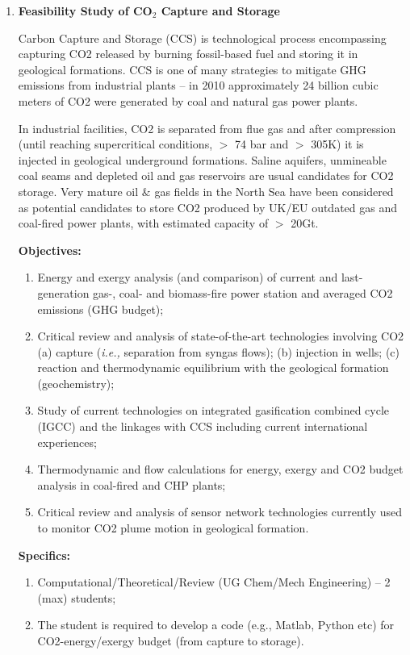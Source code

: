 \documentclass[12pts,a4paper,amsmath,amssymb,floatfix]{article}%
\newcommand{\Chem}{UG Chem/Mech Engineering}
\newcommand{\ie}{{\it i.e., }}
\begin{document}
\begin{enumerate}[label=\bfseries Project: \arabic*:]
\item {\bf Feasibility Study of CO$_{2}$ Capture and Storage}

Carbon Capture and Storage (CCS) is technological process encompassing capturing CO2 released by burning fossil-based fuel and storing it in geological formations. CCS is one of many strategies to mitigate GHG emissions from industrial plants – in 2010 approximately 24 billion cubic meters of CO2 were generated by coal and natural gas power plants. 


In industrial facilities, CO2 is separated from flue gas and after compression (until reaching supercritical conditions, $>$ 74 bar and $>$ 305K) it is injected in geological underground formations. Saline aquifers, unmineable coal seams and depleted oil and gas reservoirs are usual candidates for CO2 storage. Very mature oil $\&$ gas fields in the North Sea have been considered as potential candidates to store CO2 produced by UK/EU outdated gas and coal-fired power plants, with estimated capacity of $>$ 20Gt.

\noindent
{\bf Objectives:}
\begin{enumerate}
\item Energy and exergy analysis (and comparison) of current and last-generation gas-, coal- and biomass-fire power station and averaged CO2 emissions (GHG budget);
\item Critical review and analysis of state-of-the-art technologies involving CO2 (a) capture (\ie separation from syngas flows); (b) injection in wells; (c) reaction and thermodynamic equilibrium with the geological formation (geochemistry);
\item Study of current technologies on integrated gasification combined cycle (IGCC) and the linkages with CCS including current international experiences;
\item Thermodynamic and flow calculations for energy, exergy and CO2 budget analysis in coal-fired and CHP plants;
\item Critical review and analysis of sensor network technologies currently used to monitor CO2 plume motion in geological formation.
\end{enumerate}

\noindent
{\bf Specifics:} 
\begin{enumerate}
\item Computational/Theoretical/Review (\Chem) -- 2 (max) students;
\item The student is required to develop a code (e.g., Matlab, Python etc) for CO2-energy/exergy budget (from capture to storage).
\end{enumerate}


\end{enumerate}
\end{document}
